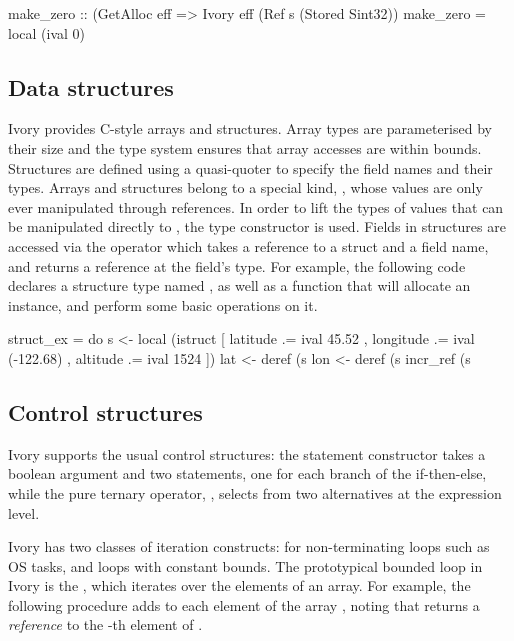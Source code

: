 \begin{code}
make_zero :: (GetAlloc eff %
          => Ivory eff (Ref s (Stored Sint32))
make_zero = local (ival 0)
\end{code}

\subsection{Data structures}

Ivory provides C-style arrays and structures.  Array types are
parameterised by their size and the type system ensures that array accesses are
within bounds. Structures are defined using a quasi-quoter to specify the
field names and their types. Arrays and structures belong to a special kind,
, whose values are only ever manipulated through references.  In order
to lift the types of values that can be manipulated directly to , the
 type constructor is used.  Fields in structures are accessed
via the \cd{\mytilde>} operator which takes a reference to a struct and a field
name, and returns a reference at the field's type. For example, the following
code declares a structure type named , as well as a function that
will allocate an instance, and perform some basic operations on it.

\begin{code}
struct_ex = do
  s <- local (istruct [ latitude  .= ival 45.52
                      , longitude .= ival (-122.68)
                      , altitude  .= ival 1524 ])
  lat <- deref (s %
  lon <- deref (s %
  incr_ref (s %
\end{code}

\subsection{Control structures}
\label{sec:control}

Ivory supports the usual control structures: the  statement
constructor takes a boolean argument and two statements, one for each
branch of the if-then-else, while the pure ternary operator, ,
selects from two alternatives at the expression level.

Ivory has two classes of iteration constructs:  for non-terminating
loops such as OS tasks, and loops with constant bounds. The prototypical
bounded loop in Ivory is the , which iterates over the elements of
an array. For example, the following
procedure adds  to each element of the array , noting
that  returns a \emph{reference} to the -th
element of .

